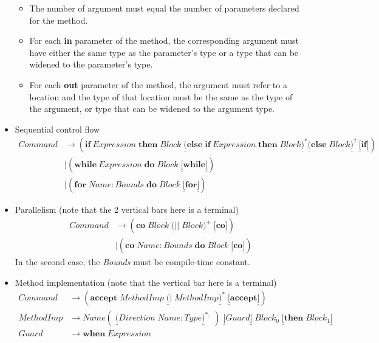 \documentclass{article}%
\begin{document}
\begin{itemize}
\begin{itemize}
\item The number of argument must equal the number of parameters declared for
the method.

\item For each \textbf{in} parameter of the method, the corresponding argument
must have either the same type as the parameter's type or a type that can be
widened to the parameter's type.

\item For each \textbf{out} parameter of the method, the argument must refer
to a location and the type of that location must be the same as the type of
the argument, or type that can be widened to the argument type.
\end{itemize}

\item Sequential control flow%
\begin{align*}
Command &  \rightarrow\left(  \mathbf{if}~Expression\;\mathbf{then}%
\;Block\;\underline{(}\mathbf{else\;if}~Expression\;\mathbf{then}%
\;Block\underline{)}^{\ast}\underline{(}\mathbf{else}\;Block\underline{)}%
^{?}~\underline{[}\mathbf{if}\underline{]}\right)  \\
&  \mid\left(  \mathbf{while}~Expression\;\mathbf{do}\;Block\;\underline{[}%
\mathbf{while}\underline{]}\right)  \\
&  \mid\left(  \mathbf{for}\;Name:Bounds\;\mathbf{do}\;Block\;\underline{[}%
\mathbf{for}\underline{]}\right)
\end{align*}


\item Parallelism (note that the 2 vertical bars here is a terminal)%
\begin{align*}
Command &  \rightarrow\left(  \mathbf{co}\;Block\;\underline{(}%
||\;Block\underline{)}^{+}\;\underline{[}\mathbf{co}\underline{]}\right)  \\
&  \mid\left(  \mathbf{co}\;Name:Bounds\;\mathbf{do}\;Block\;\underline{[}%
\mathbf{co}\underline{]}\right)
\end{align*}
In the second case, the \textit{Bounds} must be compile-time constant.

\item Method implementation (note that the vertical bar here is a terminal)%
\begin{align*}
Command  &  \rightarrow\left(  \mathbf{accept}\;MethodImp\;\underline{(}%
|\;MethodImp\underline{)}^{\ast}\;\underline{[}\mathbf{accept}\underline{]}%
\right) \\
MethodImp  &  \rightarrow Name(\;\underline{(}%
Direction\;Name:Type\underline{)}^{\ast,}\;)\;\underline{[}Guard\underline{]}%
\;Block_{0}\;\underline{[}\mathbf{then\;}Block_{1}\underline{]}\\
Guard  &  \rightarrow\mathbf{when}\;Expression
\end{align*}



\end{itemize}
\end{document}

